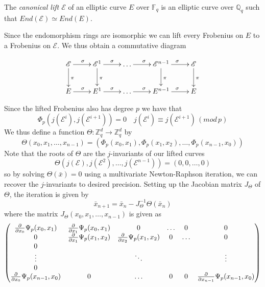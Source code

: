 \begin{mydef}
 The \emph{canonical lift $\mathscr{E}$} of an elliptic curve $E$ over $\mathbb{F}_q$ is
an elliptic curve over $\mathbb{Q}_q$ such that $End(\mathscr{E}) \simeq End(E)$.
\end{mydef}

Since the endomorphism rings are isomorphic we can lift every Frobenius on $E$ to a
Frobenius on $\mathscr{E}$. We thus obtain a commutative diagram

$$
\xymatrix {
  \mathscr{E} \ar[d]^\pi \ar[r]^\sigma & \mathscr{E}^1 \ar[d]^\pi \ar[r]^\sigma & \ldots \ar[r]^\sigma & \mathscr{E}^{n-1} \ar[d]^\pi \ar[r]^\sigma & \mathscr{E} \ar[d]^\pi \\
  E \ar[r]^\sigma & E^1 \ar[r]^\sigma &\ldots \ar[r]^\sigma & E^{n-1} \ar[r]^\sigma & E \\
}
$$

Since the lifted Frobenius also has degree $p$ we have that
$$\Phi_p(j(\mathscr{E}^i), j(\mathscr{E}^{i+1})) = 0 \quad j(\mathscr{E}^i) \equiv j(\mathscr{E}^{i+1}) \, (mod\, p) $$
We thus define a function $\Theta: \mathbb{Z}_q^d \rightarrow \mathbb{Z}_q^d$ by
$$\Theta(x_0, x_1, \ldots, x_{n-1}) = (\Phi_p(x_0, x_1), \Phi_p(x_1, x_2), \ldots, \Phi_p(x_{n-1}, x_0))$$
Note that the roots of $\Theta$ are the $j$-invariants of our lifted curves
$$\Theta(j(\mathscr{E}), j(\mathscr{E}^2), \ldots, j(\mathscr{E}^{n-1})) = (0, 0, \ldots, 0) $$
so by solving $\Theta(\bar{x}) = 0$ using a multivariate Newton-Raphson iteration, we can
recover the $j$-invariants to desired precision. Setting up the Jacobian matrix $J_\Theta$
of $\Theta$, the iteration is given by
$$ \bar{x}_{n+1} = \bar{x}_n - J_\Theta^{-1} \Theta(\bar{x}_n) $$
where the matrix $J_\Theta(x_0, x_1, \ldots, x_{n-1})$ is given as 
$$
\begin{pmatrix}
  {\partial \over \partial x_0} \Psi_p(x_0, x_1) & {\partial \over \partial x_1} \Psi_p(x_0, x_1) & 0 & \ldots & 0 & 0 \\
  0 & {\partial \over \partial x_1} \Psi_p(x_1, x_2) & {\partial \over \partial x_2} \Psi_p(x_1, x_2) & 0 & \ldots & 0 \\
  0 \\
  \vdots & & \ddots & & & \vdots \\
  0 \\
  {\partial \over \partial x_0} \Psi_p(x_{n-1}, x_0) & 0 & \ldots & 0 & 0 & {\partial \over \partial x_{n-1}} \Psi_p(x_{n-1}, x_0) \\
\end{pmatrix}
$$

